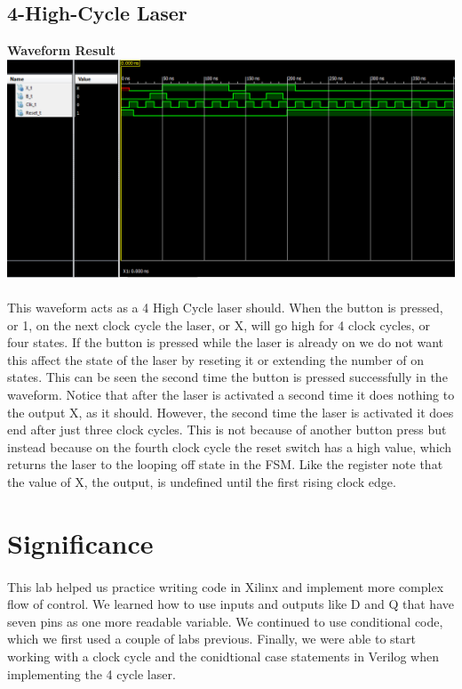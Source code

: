 \documentclass[12pt]{report}
\begin{document}
	\subsection*{4-High-Cycle Laser}
		\begin{center}
			\textbf{Waveform Result}
			\includegraphics[scale=.59]{tb.PNG}
		\end{center}		

		\paragraph{}
		This waveform acts as a 4 High Cycle laser should.  When the button is pressed, or 1, on the next clock cycle the laser, or X, will go high for 4 clock
		cycles, or four states.  If the button is pressed while the laser is already on we do not want this affect the state of the laser by reseting it or extending the
		number of on states.  This can be seen the second time the button is pressed successfully in the waveform.  Notice that after the laser is activated a second
		time it does nothing to the output X, as it should.  However, the second time the laser is activated it does end after just three clock cycles.  This is not
		because of another button press but instead because on the fourth clock cycle the reset switch has a high value, which returns the laser to the looping
		off state in the FSM.  Like the register note that the value of X, the output, is undefined until the first rising clock edge.

\section*{Significance}
	\paragraph{}
	This lab helped us practice writing code in Xilinx and implement more complex flow of control.  We learned how to use inputs and outputs like D and Q that have
	seven pins as one more readable variable.  We continued to use conditional code, which we first used a couple of labs previous.  Finally, we were able to start working with
	a clock cycle and the conidtional case statements in Verilog when implementing the 4 cycle laser.
	
\end{document}
